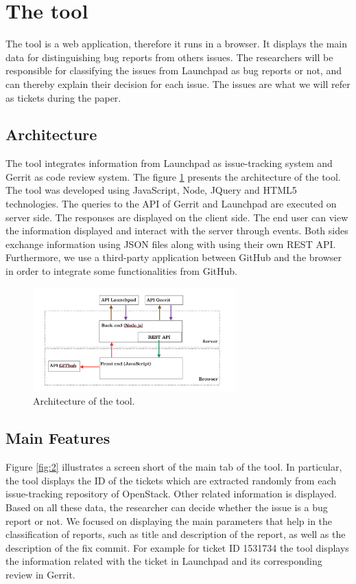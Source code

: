 \documentclass[runningheads,a4paper]{llncs}
\begin{document}
\section{The tool}
\label{sec:2}

The tool is a web application, therefore it runs in a browser. It displays the main data for distinguishing bug reports from others issues. The researchers will be responsible for classifying the issues from Launchpad as bug reports or not, and can thereby explain their decision for each issue. The issues are what we will refer as tickets during the paper.


\subsection{Architecture}

The tool integrates information from Launchpad as issue-tracking system and Gerrit as code review system. The figure \ref{fig:1} presents the architecture of the tool. The tool was developed using JavaScript, Node, JQuery and HTML5 technologies. The queries to the API of Gerrit and Launchpad are executed on server side. The responses are displayed on the client side. The end user can view the information displayed and interact with the server through events. Both sides exchange information using JSON files along with using their own REST API. Furthermore, we use a third-party application between GitHub and the browser in order to integrate some functionalities from GitHub.

\label{sec:2.1}
\begin{figure}
\centering
\includegraphics[height=4cm]{Arquitectura.png}
\caption{Architecture of the tool.}
\label{fig:1}       %
\end{figure}

\subsection{Main Features}
\label{sec:2.2}
Figure \ref{fig:2} illustrates a screen short of the main tab of the tool. In particular, the tool displays the ID of the tickets which are extracted randomly from each issue-tracking repository of OpenStack. Other related information is displayed. Based on all these data, the researcher can decide whether the issue is a bug report or not. We focused on displaying the main parameters that help in the classification of reports, such as title and description of the report, as well as the description of the fix commit. For example for ticket ID 1531734 the tool displays the information related with the ticket in Launchpad and its corresponding review in Gerrit.
\end{document}
